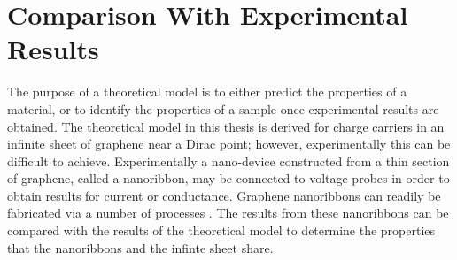 %
	\chapter{Comparison With Experimental Results}
	\label{Comparison With Experimental Results}
		The purpose of a theoretical model is to either predict the properties of a material, or to identify the properties of a sample once experimental results are obtained. The theoretical model in this thesis is derived for charge carriers in an infinite sheet of graphene near a Dirac point; however, experimentally this can be difficult to achieve. Experimentally a nano-device constructed from a thin section of graphene, called a nanoribbon, may be connected to voltage probes in order to obtain results for current or conductance. Graphene nanoribbons can readily be fabricated via a number of processes \cite{b19, b20,b21,b22, b56}. The results from these nanoribbons can be compared with the results of the theoretical model to determine the properties that the nanoribbons and the infinte sheet share. 

